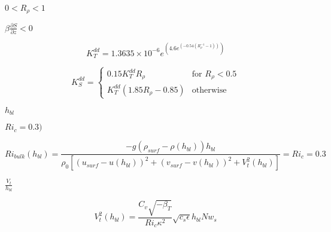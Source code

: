 {\newpage\clearpage
{}%
$0<R_\rho<1$%
\lthtmlinlinemathZ
\lthtmlcheckvsize\clearpage}

{\newpage\clearpage
{}%
$\beta \frac{\partial S}{\partial z}<0$%
\lthtmlinlinemathZ
\lthtmlcheckvsize\clearpage}

{\newpage\clearpage
{}%
\begin{displaymath}
K_T^{dd} =  
1.3635\times10^{-6}
e^{\left( 4.6e^{\left(-0.54(R_\rho^{-1}-1)\right)}\right)}
\end{displaymath}%
\lthtmldisplayZ
\lthtmlcheckvsize\clearpage}

{\newpage\clearpage
{}%
\begin{displaymath}
K_S^{dd}=\left\{
        \begin{array}{ll}
       0.15K_T^{dd}R_\rho & \mbox{for }  R_\rho<0.5\\
       K_T^{dd}(1.85R_\rho-0.85)
        &  \mbox{otherwise}
        \end{array}
\right.
\end{displaymath}%
\lthtmldisplayZ
\lthtmlcheckvsize\clearpage}

{\newpage\clearpage
{}%
$h_{bl}$%
\lthtmlinlinemathZ
\lthtmlcheckvsize\clearpage}

{\newpage\clearpage
{}%
$Ri_c=0.3)$%
\lthtmlinlinemathZ
\lthtmlcheckvsize\clearpage}

{\newpage\clearpage
{}%
\begin{displaymath}
Ri_{bulk}(h_{bl})=\frac{-g(\rho_{surf}-\rho(h_{bl}))h_{bl}}
{\rho_0\left[ \left(u_{surf}-u(h_{bl})\right)^2+
\left(v_{surf}-v(h_{bl})\right)^2+V_t^2(h_{bl})\right]}
=Ri_c=0.3
\end{displaymath}%
\lthtmldisplayZ
\lthtmlcheckvsize\clearpage}

{\newpage\clearpage
{}%
$\frac{V_t}{h_{bl}}$%
\lthtmlinlinemathZ
\lthtmlcheckvsize\clearpage}

{\newpage\clearpage
{}%
\begin{displaymath}
V_t^2(h_{bl})=\frac{C_v \sqrt{-\beta_T}}{Ri_c \kappa^2}
\sqrt{c_s \epsilon}
h_{bl}N w_s
\end{displaymath}%
\lthtmldisplayZ
\lthtmlcheckvsize\clearpage}

